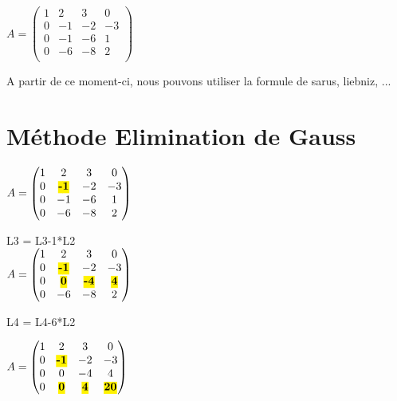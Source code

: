 \vspace{5mm} %

$
A =
\begin{pmatrix}
  1 & 2 & 3 & 0   \\
  0 & -1 & -2 & -3   \\
  0 & -1 & -6 & 1 \\
  0 & -6 & -8 & 2 \\
\end{pmatrix}
$

\vspace{5mm} %

A partir de ce moment-ci, nous pouvons utiliser la formule de sarus, liebniz, ... \\

\section{Méthode Elimination de Gauss}

\vspace{5mm} %

$
A =
\begin{pmatrix}
  1 & 2 & 3 & 0   \\
  0 & \hl{\textbf{-1}} & -2 & -3   \\
  0 & -1 & -6 & 1 \\
  0 & -6 & -8 & 2 \\
\end{pmatrix}
$

\vspace{5mm} %

L3 = L3-1*L2 \\

$
A =
\begin{pmatrix}
  1 & 2 & 3 & 0    \\
  0 & \hl{\textbf{-1}} & -2 & -3 \\
  0 & \hl{\textbf{0}} & \hl{\textbf{-4}} & \hl{\textbf{4}}   \\
  0 & -6 & -8 & 2  \\
\end{pmatrix}
$

\newpage
L4 = L4-6*L2 \\

\vspace{5mm} %

$
A =
\begin{pmatrix}
  1 & 2 & 3 & 0    \\
  0 & \hl{\textbf{-1}} & -2 & -3 \\
  0 & 0 & -4 & 4   \\
  0 & \hl{\textbf{0}} & \hl{\textbf{4}} & \hl{\textbf{20}}   \\
\end{pmatrix}
$

